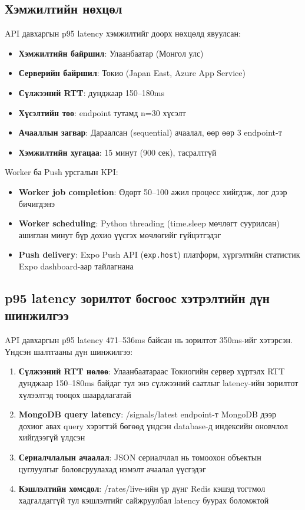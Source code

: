 \subsection*{Хэмжилтийн нөхцөл}

API давхаргын p95 latency хэмжилтийг доорх нөхцөлд явуулсан:
\begin{itemize}
    \item \textbf{Хэмжилтийн байршил}: Улаанбаатар (Монгол улс)
    \item \textbf{Серверийн байршил}: Токио (Japan East, Azure App Service)
    \item \textbf{Сүлжээний RTT}: дунджаар 150--180ms
    \item \textbf{Хүсэлтийн тоо}: endpoint тутамд n=30 хүсэлт
    \item \textbf{Ачааллын загвар}: Дараалсан (sequential) ачаалал, өөр өөр 3 endpoint-т
    \item \textbf{Хэмжилтийн хугацаа}: 15 минут (900 сек), тасралтгүй
\end{itemize}

Worker ба Push урсгалын KPI:
\begin{itemize}
    \item \textbf{Worker job completion}: Өдөрт 50--100 ажил процесс хийгдэж, лог дээр бичигдэнэ
    \item \textbf{Worker scheduling}: Python threading (time.sleep мөчлөгт суурилсан) ашиглан минут бүр дохио үүсгэх мөчлөгийг гүйцэтгэдэг
    \item \textbf{Push delivery}: Expo Push API (\texttt{exp.host}) платформ, хүргэлтийн статистик Expo dashboard-аар тайлагнана
\end{itemize}

\subsection*{p95 latency зорилтот босгоос хэтрэлтийн дүн шинжилгээ}

API давхаргын p95 latency 471--536ms байсан нь зорилтот 350ms-ийг хэтэрсэн. Үндсэн шалтгааны дүн шинжилгээ:

\begin{enumerate}
    \item \textbf{Сүлжээний RTT нөлөө}: Улаанбаатараас Токиогийн сервер хүртэлх RTT дунджаар 150--180ms байдаг тул энэ сүлжээний саатлыг latency-ийн зорилтот хүлээлтэд тооцох шаардлагатай
    \item \textbf{MongoDB query latency}: /signals/latest endpoint-т MongoDB дээр дохиог авах query хэрэгтэй бөгөөд үндсэн database-д индексийн оновчлол хийгдээгүй үлдсэн
    \item \textbf{Сериалчлалын ачаалал}: JSON сериалчлал нь томоохон объектын цуглуулгыг боловсруулахад нэмэлт ачаалал үүсгэдэг
    \item \textbf{Кэшлэлтийн хомсдол}: /rates/live-ийн үр дүнг Redis кэшэд тогтмол хадгалдаггүй тул кэшлэлтийг сайжруулбал latency буурах боломжтой
\end{enumerate}

